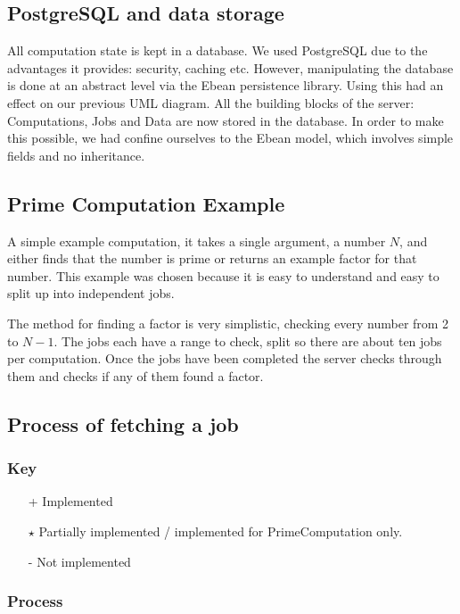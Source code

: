 \documentclass[a4paper,10pt]{article}
\begin{document}
\subsection{PostgreSQL and data storage}
All computation state is kept in a database. We used PostgreSQL due to the advantages it provides: security, caching etc. However, manipulating the database is done at an abstract level via the Ebean persistence library. Using this had an effect on our previous UML diagram. All the building blocks of the server: Computations, Jobs and Data are now stored in the database. In order to make this possible, we had confine ourselves to the Ebean model, which involves simple fields and no inheritance. 


\subsection{Prime Computation Example}

A simple example computation, it takes a single argument, a number $N$, and either finds that the number is prime or returns an example factor for that number.
This example was chosen because it is easy to understand and easy to split up into independent jobs.

The method for finding a factor is very simplistic, checking every number from 2 to $N-1$. The jobs each have a range to check, split so there are about ten jobs per computation.
Once the jobs have been completed the server checks through them and checks if any of them found a factor.


\subsection{Process of fetching a job}

\subsubsection{Key}
\begin{itemize}
\item[+] Implemented
\item[$\star$] Partially implemented / implemented for PrimeComputation only.
\item[-] Not implemented
\end{itemize}

\subsubsection{Process}
\end{document}
